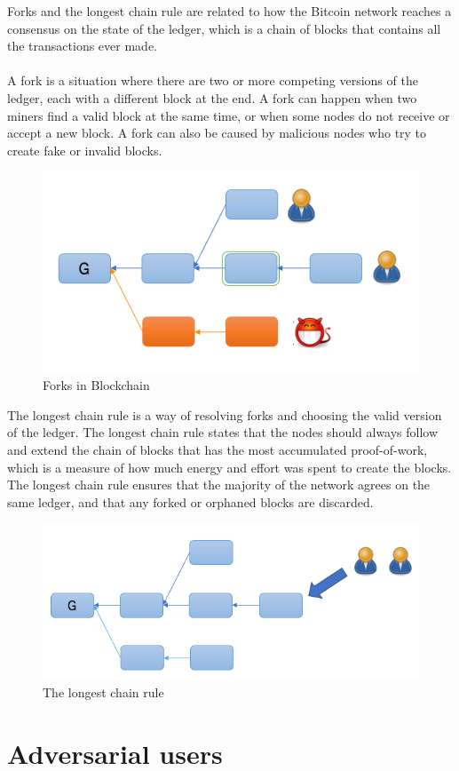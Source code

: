 \documentclass{report}
\begin{document}
 Forks and the longest chain rule are related to how the Bitcoin network reaches a consensus on the state of the ledger, which is a chain of blocks that contains all the transactions ever made.\\\\
A fork is a situation where there are two or more competing versions of the ledger, each with a different block at the end. A fork can happen when two miners find a valid block at the same time, or when some nodes do not receive or accept a new block. A fork can also be caused by malicious nodes who try to create fake or invalid blocks.
\begin{center}
	\begin{figure}[h!]
		\centering
		\includegraphics[width=0.6\linewidth]{Fig/F1}
		\caption{Forks in Blockchain}
		\label{fig:f1}
	\end{figure}
\end{center}
The longest chain rule is a way of resolving forks and choosing the valid version of the ledger. The longest chain rule states that the nodes should always follow and extend the chain of blocks that has the most accumulated proof-of-work, which is a measure of how much energy and effort was spent to create the blocks. The longest chain rule ensures that the majority of the network agrees on the same ledger, and that any forked or orphaned blocks are discarded.
\begin{center}
	\begin{figure}[h!]
		\centering
		\includegraphics[width=0.6\linewidth]{Fig/F2}
		\caption{The longest chain rule}
		\label{fig:f2}
	\end{figure}
\end{center}


\section{Adversarial users}
\end{document}
